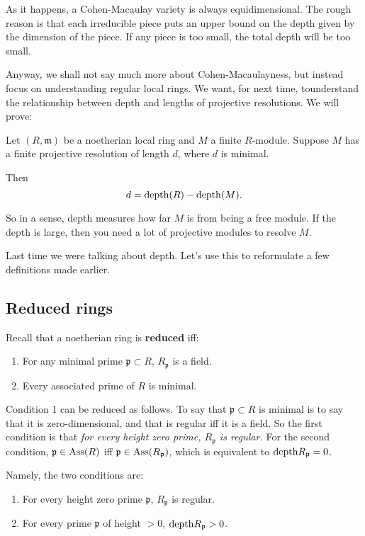 As it happens, a Cohen-Macaulay variety is always
equidimensional. The rough
reason is that each irreducible piece puts an upper bound on the
depth given by
the dimension of the piece. If any piece is too small, the total
depth will be
too small. 

Anyway, we shall not say much more about Cohen-Macaulayness, but
instead focus
on understanding regular local rings. We want, for next time,
tounderstand the relationship
between depth and lengths of projective resolutions.
We will prove:

\begin{theorem} Let $(R,
\mathfrak{m})$ be a
noetherian local ring and $M$ a finite $R$-module. Suppose $M$
has a finite
projective resolution of length $d$, where $d$ is minimal. 

Then
\[ d = \mathrm{depth}(R) - \mathrm{depth}(M).  \]
\end{theorem} 
So in a sense, depth measures how far $M$ is from being a free
module. If the
depth is large, then you need a lot of projective modules to
resolve $M$.

Last time we were talking about depth. Let's use this to
reformulate a few
definitions made earlier. 

\subsection{Reduced rings}
Recall that a noetherian ring is \textbf{reduced} iff:
\begin{enumerate}
\item For any minimal prime $\mathfrak{p} \subset R$,
$R_{\mathfrak{p}}$ is a
field.
\item Every associated prime of $R$ is minimal.
\end{enumerate}

Condition 1 can be reduced as follows. To say that
$\mathfrak{p}\subset R$ is
minimal is to say that it is zero-dimensional, and that is
regular iff it is a
field. So the first condition is that \emph{for every height
zero prime,
$R_{\mathfrak{p}}$ is regular.} For the second condition,
$\mathfrak{p} \in
\operatorname{Ass}(R)$ iff $\mathfrak{p} \in \operatorname{Ass}(R_{\mathfrak{p}})$, which is
equivalent to
$\mathrm{depth} R_{\mathfrak{p}} = 0$. 

Namely, the two conditions are:
\begin{enumerate}
\item For every height zero prime $\mathfrak{p} $,
$R_{\mathfrak{p}}$ is
regular.
\item For every prime $\mathfrak{p}$ of height $>0$, $\mathrm{depth}
R_{\mathfrak{p}} >
0$.
\end{enumerate}

